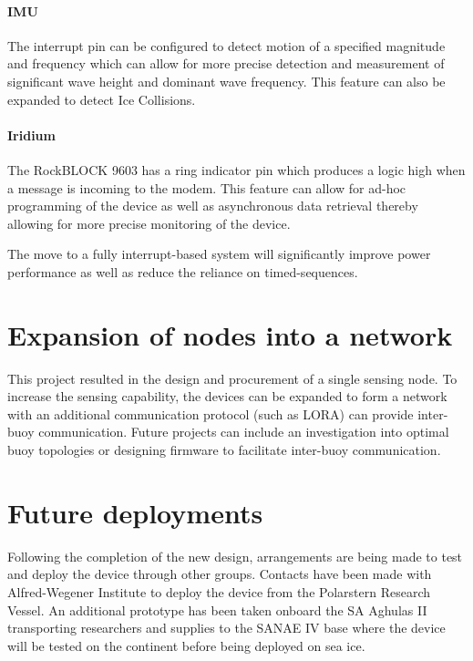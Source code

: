 \paragraph{IMU}
The interrupt pin can be configured to detect motion of a specified magnitude and frequency which can allow for more precise detection and measurement of significant wave height and dominant wave frequency. This feature can also be expanded to detect Ice Collisions.

\paragraph{Iridium}

The RockBLOCK 9603 has a ring indicator pin which produces a logic high when a message is incoming to the modem. This feature can allow for ad-hoc programming of the device as well as asynchronous data retrieval thereby allowing for more precise monitoring of the device. 

The move to a fully interrupt-based system will significantly improve power performance as well as reduce the reliance on timed-sequences.

\section{Expansion of nodes into a network}

This project resulted in the design and procurement of a single sensing node. To increase the sensing capability, the devices can be expanded to form a network with an additional communication protocol (such as LORA) can provide inter-buoy communication. Future projects can include an investigation into optimal buoy topologies or designing firmware to facilitate inter-buoy communication.

\section{Future deployments}

Following the completion of the new design, arrangements are being made to test and deploy the device through other groups. Contacts have been made with Alfred-Wegener Institute to deploy the device from the Polarstern Research Vessel. An additional prototype has been taken onboard the SA Aghulas II transporting researchers and supplies to the SANAE IV base where the device will be tested on the continent before being deployed on sea ice.
